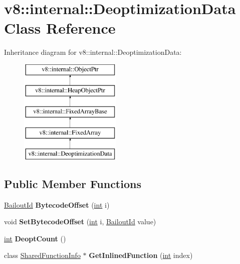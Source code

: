 \hypertarget{classv8_1_1internal_1_1DeoptimizationData}{}\section{v8\+:\+:internal\+:\+:Deoptimization\+Data Class Reference}
\label{classv8_1_1internal_1_1DeoptimizationData}
Inheritance diagram for v8\+:\+:internal\+:\+:Deoptimization\+Data\+:\begin{figure}[H]
\begin{center}
\leavevmode
\includegraphics[height=5.000000cm]{classv8_1_1internal_1_1DeoptimizationData}
\end{center}
\end{figure}
\subsection*{Public Member Functions}
\begin{DoxyCompactItemize}
\item 
\mbox{\label{classv8_1_1internal_1_1DeoptimizationData_a4d84510b0dc16235b943b9cdb2deacd8}} 
\mbox{\hyperlink{classv8_1_1internal_1_1BailoutId}{Bailout\+Id}} {\bfseries Bytecode\+Offset} (\mbox{\hyperlink{classint}{int}} i)
\item 
\mbox{\label{classv8_1_1internal_1_1DeoptimizationData_aaf1ee172c26cd7896b5ed0fcd896888c}} 
void {\bfseries Set\+Bytecode\+Offset} (\mbox{\hyperlink{classint}{int}} i, \mbox{\hyperlink{classv8_1_1internal_1_1BailoutId}{Bailout\+Id}} value)
\item 
\mbox{\label{classv8_1_1internal_1_1DeoptimizationData_aebe320a3f0d781ba35e685c945b46267}} 
\mbox{\hyperlink{classint}{int}} {\bfseries Deopt\+Count} ()
\item 
\mbox{\label{classv8_1_1internal_1_1DeoptimizationData_a462331a1c7cb113663f8d404c8afe1f2}} 
class \mbox{\hyperlink{classv8_1_1internal_1_1SharedFunctionInfo}{Shared\+Function\+Info}} $\ast$ {\bfseries Get\+Inlined\+Function} (\mbox{\hyperlink{classint}{int}} index)
\end{DoxyCompactItemize}
